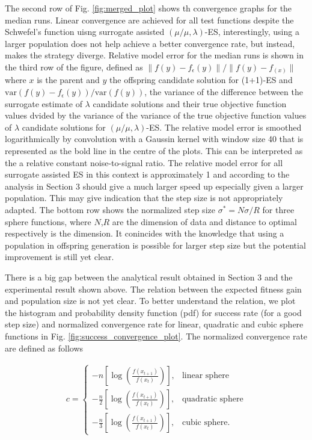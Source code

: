 The second row of Fig. \ref{fig:merged_plot} shows th convergence graphs for the median runs. Linear convergence are achieved for all test functions despite the Schwefel's function uisng surrogate assisted $(\mu/\mu,\lambda)$-ES, interestingly, using a larger population does not help achieve a better convergence rate, but instead,  makes the strategy diverge. Relative model error for the median runs is shown in the third row of the figure, defined as $\|f(y)-f_{\epsilon}(y) \|/\|f(y)-f_(x) \|$ where $x$ is the parent and $y$ the offspring candidate solution for (1+1)-ES and $\text{var}(f(y)-f_\epsilon(y))/\text{var}(f(y))$, the variance of the difference between the surrogate estimate of $\lambda$ candidate solutions and their true objective function values dvided by the variance of the variance of the true objective function values of $\lambda$ candidate solutions for $(\mu/\mu,\lambda)$-ES. The relative model error is smoothed logarithmically by convolution with a Gaussin kernel with window size 40 that is represented as the bold line in the centre of the plots. This can be interpreted as the a relative constant noise-to-signal ratio. The relative model error for all surrogate assisted ES in this context is approximately 1 and according to the analysis in Section 3 should give a much larger speed up especially given a larger population. This may give indication that the step size is not appropriately adapted. The bottom row shows the normalized step size $\sigma^* = N \sigma/R$ for three sphere functions, where $N$,$R$ are the dimension of data and distance to optimal respectively is the dimension. It conincides with the knowledge that using a population in offspring generation is possible for larger step size but the potential improvement is still yet clear. 

There is a big gap between the analytical result obtained in Section 3 and the experimental result shown above. The relation between the expected fitness gain and population size is not yet clear. To better understand the relation, we plot the histogram and probability density function (pdf) for success rate (for a good step size) and normalized convergence rate for linear, quadratic and cubic sphere functions in Fig. \ref{fig:success_convergence_plot}. The normalized convergence rate are defined as follows 

\begin{align}
c = 
\begin{cases}
- n \left[ \log \left( \frac{f(x_{t+1})}{f(x_t)} \right)\right],& \text{linear sphere} \\
 - \frac{n}{2} \left[ \log \left( \frac{f(x_{t+1})}{f(x_t)} \right)\right],& \text{quadratic sphere} \\
- \frac{n}{3} \left[ \log \left( \frac{f(x_{t+1})}{f(x_t)} \right)\right],& \text{cubic sphere}.
\end{cases}
\end{align}

